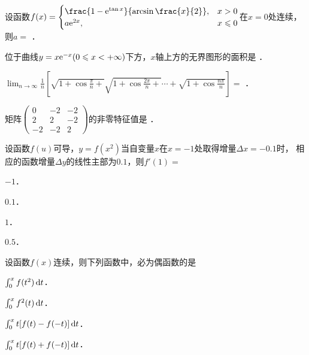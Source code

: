 \documentclass[plain,noanswer,medmath]{../../template/jnuexam}
\begin{document}






\begin{problem}
设函数$f(x) = \begin{cases}
  \frac{1 - \e^{\tan x}}{\arcsin \frac{x}{2}},& x > 0 \\
  a\e^{2x}, & x \le 0
\end{cases}$在$x = 0$处连续，则$a =$ \fillin{}．
\end{problem}


\begin{problem}
位于曲线$y = x\mathrm{e}^{- x}(0 \leqslant x < +\infty)$下方，$x$轴上方的无界图形的面积是 \fillin{}．
\end{problem}




\begin{problem}
$\lim_{n \to \infty} \frac{1}{n}\left[\sqrt{1 + \cos \frac{\pi}{n} +} \sqrt{1 + \cos \frac{2\pi}{n} +}
  \cdots + \sqrt{1 + \cos \frac{n\pi}{n}} \right] =$ \fillin{}．
\end{problem}


\begin{problem}
矩阵$\begin{pmatrix}
   0 & -2 & -2 \\
   2 &  2 & -2 \\
  -2 & -2 & 2
\end{pmatrix}$的非零特征值是 \fillin{}．
\end{problem}




\begin{problem}
设函数$f(u)$可导，$y = f(x^2)$当自变量$x$在$x = - 1$处取得增量$\Delta x = - 0.1$时，
相应的函数增量$\Delta y$的线性主部为$0.1$，则$f'(1) =$\pickout{}
\begin{abcd}
\item $-1$．
\item $0.1$．
\item $1$．
\item $0.5$．
\end{abcd}
\end{problem}


\begin{problem}
设函数$f(x)$连续，则下列函数中，必为偶函数的是\pickout{}
\begin{abcd}
\item $\int_0^x f(t^2) \mathop{}\!\mathrm{d} t$．
\item $\int_0^x f^2(t) \mathop{}\!\mathrm{d} t$．
\item $\int_0^x t[f(t) - f(- t)]\mathop{}\!\mathrm{d} t$．
\item $\int_0^x t[f(t) + f(- t)]\mathop{}\!\mathrm{d} t$．
\end{abcd}
\end{problem}
\end{document}
